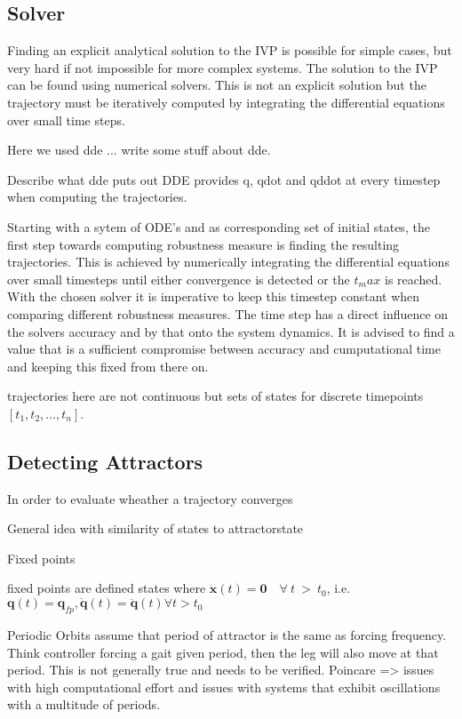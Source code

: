 \subsection{Solver}

Finding an explicit analytical solution to the IVP is possible for simple cases, but very hard if not impossible for more complex systems. 
The solution to the IVP can be found using numerical solvers. This is not an explicit solution but the trajectory must be iteratively computed by integrating the differential equations over small time steps. 

Here we used dde ... write some stuff about dde.

Describe what dde puts out
    DDE provides q, qdot and qddot at every timestep when computing the trajectories. 


Starting with a sytem of ODE's and as corresponding set of initial states, the first step towards computing robustness measure is finding the resulting trajectories. This is achieved by numerically integrating the differential equations over small timesteps until either convergence is detected or the $t_max$ is reached. With the chosen solver it is imperative to keep this timestep constant when comparing different robustness measures. The time step has a direct influence on the solvers accuracy and by that onto the system dynamics. It is advised to find a value that is a sufficient compromise between accuracy and cumputational time and keeping this fixed from there on.

trajectories here are not continuous but sets of states for discrete timepoints $[t_1,t_2,\ldots, t_n]$. 


\subsection{Detecting Attractors}

In order to evaluate wheather a trajectory converges 
    
    General idea with similarity of states to attractorstate

    Fixed points

    fixed points are defined states where $\dot{\mathbf{x}}(t) = \mathbf{0} \quad \forall \ t\  >\  t_0 $, i.e. $\mathbf{q}(t)=\mathbf{q}_{fp}, \dot{\mathbf{q}}(t) = \ddot{\mathbf{q}}(t)  \forall t > t_0$

    Periodic Orbits
        assume that period of attractor is the same as forcing frequency. Think controller forcing a gait given period, then the leg will also move at that period. This is not generally true and needs to be verified. 
        Poincare => issues with high computational effort and issues with systems that exhibit oscillations with a multitude of periods. 


